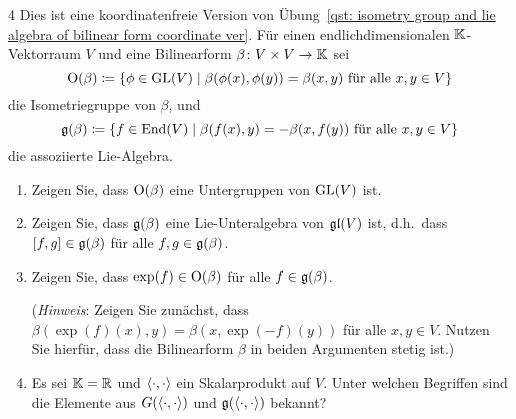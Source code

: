 \begin{question}[subtitle = Isometriegruppe und Lie-Algebra einer Bilinearform ohne Koordinaten]{4}
  Dies ist eine koordinatenfreie Version von Übung~\ref{qst: isometry group and lie algebra of bilinear form coordinate ver}.
  Für einen endlichdimensionalen $\mathbb{K}$-Vektorraum $V$ und eine Bilinearform $\beta \colon V \times V \to \mathbb{K}$ sei
  \[
              \operatorname{O}(\beta)
    \coloneqq \{ \phi \in \operatorname{GL}(V) \mid \text{$\beta(\phi(x), \phi(y)) = \beta(x,y)$ für alle $x,y \in V$} \}
  \]
  die Isometriegruppe von $\beta$, und
  \[
              \mathfrak{g}(\beta)
    \coloneqq \{ f \in \operatorname{End}(V) \mid \text{$\beta(f(x),y) = -\beta(x, f(y))$ für alle $x, y \in V$} \}
  \]
  die assoziierte Lie-Algebra.
  \begin{enumerate}[leftmargin=*]
    \item
      Zeigen Sie, dass $\operatorname{O}(\beta)$ eine Untergruppen von $\operatorname{GL}(V)$ ist.
    \item
      Zeigen Sie, dass $\mathfrak{g}(\beta)$ eine Lie-Unteralgebra von $\mathfrak{gl}(V)$ ist, d.h.\ dass $[f,g] \in \mathfrak{g}(\beta)$ für alle $f, g \in \mathfrak{g}(\beta)$.
    \item
      Zeigen Sie, dass $\exp(f) \in \operatorname{O}(\beta)$ für alle $f \in \mathfrak{g}(\beta)$.
      
      (\emph{Hinweis}:
       Zeigen Sie zunächst, dass $\beta(\exp(f)(x) ,y) = \beta(x, \exp(-f)(y))$ für alle $x, y \in V$.
       Nutzen Sie hierfür, dass die Bilinearform $\beta$ in beiden Argumenten stetig ist.)
    \item
      Es sei $\mathbb{K} = \mathbb{R}$ und $\left\langle \cdot, \cdot \right\rangle$ ein Skalarprodukt auf $V$.
      Unter welchen Begriffen sind die Elemente aus $G(\left\langle \cdot, \cdot \right\rangle)$ und $\mathfrak{g}(\left\langle \cdot, \cdot \right\rangle)$ bekannt?
  \end{enumerate}
\end{question}


